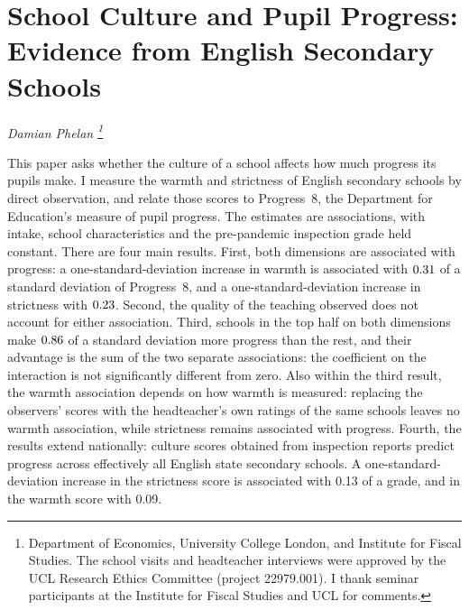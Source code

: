 \chapter{School Culture and Pupil Progress: Evidence from English Secondary Schools}
\label{ch:paper2}
\resetcounterformats

\begin{center}
  \textit{Damian Phelan%
    \footnote{Department of Economics, University College London, and
      Institute for Fiscal Studies. The
      school visits and headteacher interviews were approved by the UCL
      Research Ethics Committee (project 22979.001). I thank seminar
      participants at the Institute for Fiscal Studies and UCL for
      comments.}}
\end{center}

\begin{chapterabstract}
This paper asks whether the culture of a school affects how much progress its pupils make. I measure the warmth and strictness of \NTierOne{} English secondary schools by direct observation, and relate those scores to Progress~8, the Department for Education's measure of pupil progress. The estimates are associations, with intake, school characteristics and the pre-pandemic inspection grade held constant. There are four main results. First, both dimensions are associated with progress: a one-standard-deviation increase in warmth is associated with $0.31$ of a standard deviation of Progress~8, and a one-standard-deviation increase in strictness with $0.23$. Second, the quality of the teaching observed does not account for either association. Third, schools in the top half on both dimensions make $0.86$ of a standard deviation more progress than the rest, and their advantage is the sum of the two separate associations: the coefficient on the interaction is not significantly different from zero. Also within the third result, the warmth association depends on how warmth is measured: replacing the observers' scores with the headteacher's own ratings of the same schools leaves no warmth association, while strictness remains associated with progress. Fourth, the results extend nationally: culture scores obtained from inspection reports predict progress across effectively all English state secondary schools. A one-standard-deviation increase in the strictness score is associated with 0.13 of a grade, and in the warmth score with 0.09.
\end{chapterabstract}

